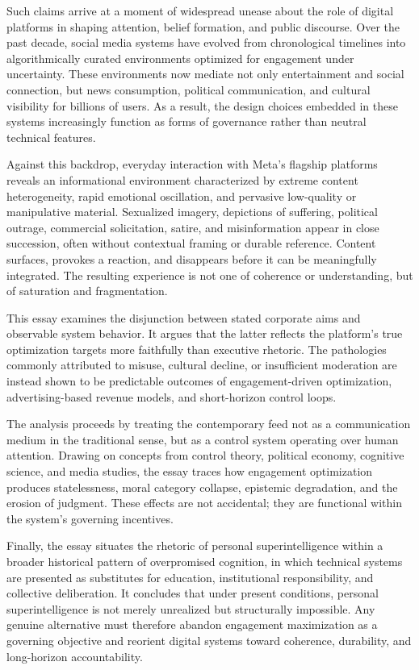 \documentclass[12pt]{article}
\begin{document}
Such claims arrive at a moment of widespread unease about the role of digital platforms in shaping attention, belief formation, and public discourse. Over the past decade, social media systems have evolved from chronological timelines into algorithmically curated environments optimized for engagement under uncertainty. These environments now mediate not only entertainment and social connection, but news consumption, political communication, and cultural visibility for billions of users. As a result, the design choices embedded in these systems increasingly function as forms of governance rather than neutral technical features.

Against this backdrop, everyday interaction with Meta's flagship platforms reveals an informational environment characterized by extreme content heterogeneity, rapid emotional oscillation, and pervasive low-quality or manipulative material. Sexualized imagery, depictions of suffering, political outrage, commercial solicitation, satire, and misinformation appear in close succession, often without contextual framing or durable reference. Content surfaces, provokes a reaction, and disappears before it can be meaningfully integrated. The resulting experience is not one of coherence or understanding, but of saturation and fragmentation.

This essay examines the disjunction between stated corporate aims and observable system behavior. It argues that the latter reflects the platform's true optimization targets more faithfully than executive rhetoric. The pathologies commonly attributed to misuse, cultural decline, or insufficient moderation are instead shown to be predictable outcomes of engagement-driven optimization, advertising-based revenue models, and short-horizon control loops.

The analysis proceeds by treating the contemporary feed not as a communication medium in the traditional sense, but as a control system operating over human attention. Drawing on concepts from control theory, political economy, cognitive science, and media studies, the essay traces how engagement optimization produces statelessness, moral category collapse, epistemic degradation, and the erosion of judgment. These effects are not accidental; they are functional within the system’s governing incentives.

Finally, the essay situates the rhetoric of personal superintelligence within a broader historical pattern of overpromised cognition, in which technical systems are presented as substitutes for education, institutional responsibility, and collective deliberation. It concludes that under present conditions, personal superintelligence is not merely unrealized but structurally impossible. Any genuine alternative must therefore abandon engagement maximization as a governing objective and reorient digital systems toward coherence, durability, and long-horizon accountability.
\end{document}
